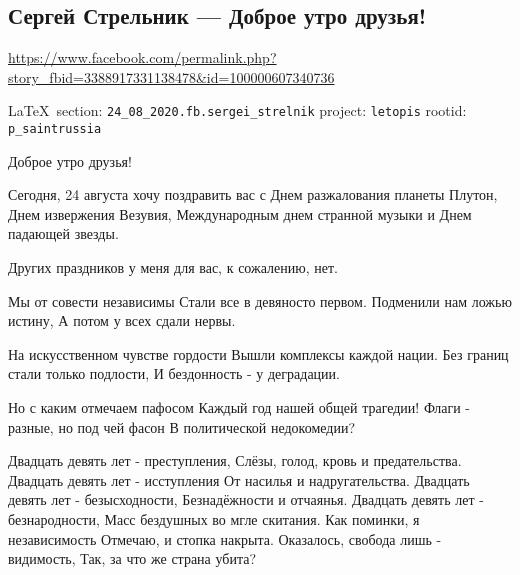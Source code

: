  
 
\subsection{Сергей Стрельник --- Доброе утро друзья!}
\url{https://www.facebook.com/permalink.php?story_fbid=3388917331138478&id=100000607340736}
  
\vspace{0.5cm}
 {\ifDEBUG\small\LaTeX~section: \verb|24_08_2020.fb.sergei_strelnik| project: \verb|letopis| rootid: \verb|p_saintrussia| \fi}
\vspace{0.5cm}
  
Доброе утро друзья!

Сегодня, 24 августа хочу поздравить вас с Днем разжалования планеты Плутон, Днем извержения Везувия, Международным днем странной музыки и Днем падающей звезды.

Других праздников у меня для вас, к сожалению, нет.

\begin{multicols}{2}
	\obeycr
Мы от совести независимы
Стали все в девяносто первом.
Подменили нам ложью истину,
А потом у всех сдали нервы.

На искусственном чувстве гордости
Вышли комплексы каждой нации.
Без границ стали только подлости,
И бездонность - у деградации.

Но с каким отмечаем пафосом
Каждый год нашей общей трагедии!
Флаги - разные, но под чей фасон
В политической недокомедии?

Двадцать девять лет - преступления,
Слёзы, голод, кровь и предательства.
Двадцать девять лет - исступления
От насилья и надругательства.
Двадцать девять лет - безысходности,
Безнадёжности и отчаянья.
Двадцать девять лет - безнародности,
Масс бездушных во мгле скитания.
Как поминки, я независимость
Отмечаю, и стопка накрыта.
Оказалось, свобода лишь - видимость,
Так, за что же страна убита?  
	\restorecr
\end{multicols}
